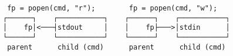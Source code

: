 \documentclass[varwidth,crop]{standalone}
\begin{document}
\begin{verbatim}
 fp = popen(cmd, "r");        fp = popen(cmd, "w");    
┌──────┐    ┌───────────┐    ┌──────┐    ┌───────────┐
│    fp│<───┤stdout     │    │    fp├───>│stdin      │
└──────┘    └───────────┘    └──────┘    └───────────┘
 parent      child (cmd)      parent      child (cmd) 
\end{verbatim}
\end{document}
